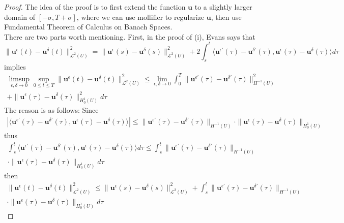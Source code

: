 \documentclass{article}
\begin{document}
\begin{proof}
    The idea of the proof is to first extend the function $\textbf{u}$ to a slightly larger domain of $[-\sigma,T+\sigma]$, where we can use mollifier to regularize $\textbf{u}$, then use Fundamental Theorem of Calculus on Banach Spaces. \\
    \indent There are two parts worth mentioning. First, in the proof of (i), Evans says that 
    $$
    \|\textbf{u}^\epsilon(t)-\textbf{u}^\delta(t)\|_{\mathscr{L}^2(U)}^2=\|\textbf{u}^\epsilon(s)-\textbf{u}^\delta(s)\|_{\mathscr{L}^2(U)}^2+2\int_s^t\langle\textbf{u}^{\epsilon'}(\tau)-\textbf{u}^{\delta'}(\tau), \textbf{u}^\epsilon(\tau)-\textbf{u}^\delta(\tau)\rangle d\tau
    $$ implies 
    \begin{align*}
        \limsup_{\epsilon,\delta\to0} \sup_{0\leq t\leq T} \|\textbf{u}^\epsilon(t)-\textbf{u}^\delta(t)\|_{\mathscr{L}^2(U)}^2 \leq \lim_{\epsilon,\delta\to 0}\int_0^T\|\textbf{u}^{\epsilon'}(\tau)-\textbf{u}^{\delta'}(\tau)\|_{H^{-1}(U)}^2 \\
        +\|\textbf{u}^\epsilon(\tau)-\textbf{u}^\delta(\tau)\|_{H_0^1(U)}^2d\tau
    \end{align*}
    The reason is as follows: Since 
    \begin{align*}
        \left|\langle\textbf{u}^{\epsilon'}(\tau)-\textbf{u}^{\delta'}(\tau), \textbf{u}^\epsilon(\tau)-\textbf{u}^\delta(\tau)\rangle \right|\leq \|\textbf{u}^{\epsilon'}(\tau)-\textbf{u}^{\delta'}(\tau)\|_{H^{-1}(U)}\cdot \|\textbf{u}^\epsilon(\tau)-\textbf{u}^\delta(\tau)\|_{H_0^1(U)}
    \end{align*}
    thus 
    \begin{align*}
        \int_s^t\langle\textbf{u}^{\epsilon'}(\tau)-\textbf{u}^{\delta'}(\tau), \textbf{u}^\epsilon(\tau)-\textbf{u}^\delta(\tau)\rangle d\tau\leq \int_s^t \|\textbf{u}^{\epsilon'}(\tau)-\textbf{u}^{\delta'}(\tau)\|_{H^{-1}(U)} \\
        \cdot \|\textbf{u}^\epsilon(\tau)-\textbf{u}^\delta(\tau)\|_{H_0^1(U)}d\tau
    \end{align*}
    then 
    \begin{align*}
        \|\textbf{u}^\epsilon(t)-\textbf{u}^\delta(t)\|_{\mathscr{L}^2(U)}^2\leq \|\textbf{u}^\epsilon(s)-\textbf{u}^\delta(s)\|_{\mathscr{L}^2(U)}^2 + \int_s^t \|\textbf{u}^{\epsilon'}(\tau)-\textbf{u}^{\delta'}(\tau)\|_{H^{-1}(U)} \\
        \cdot \|\textbf{u}^\epsilon(\tau)-\textbf{u}^\delta(\tau)\|_{H_0^1(U)}d\tau 
    \end{align*}

\end{proof}
\end{document}
